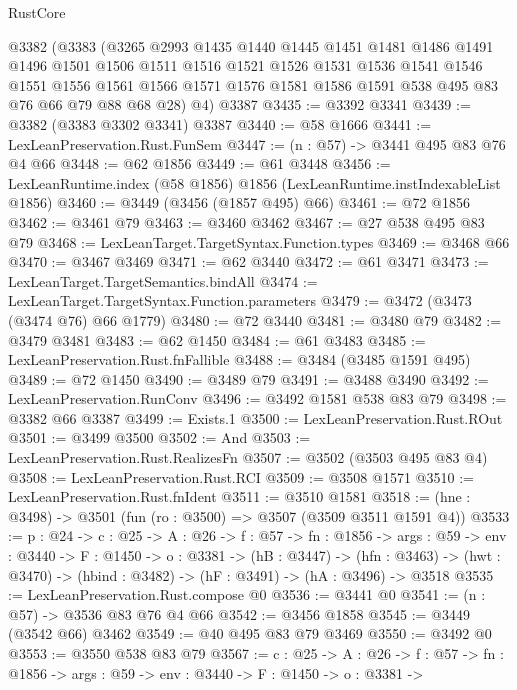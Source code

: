 \begin{lexlean}{RustCore}
\begin{coremodule}
  @3382
    (@3383
      (@3265
        @2993
        @1435
        @1440
        @1445
        @1451
        @1481
        @1486
        @1491
        @1496
        @1501
        @1506
        @1511
        @1516
        @1521
        @1526
        @1531
        @1536
        @1541
        @1546
        @1551
        @1556
        @1561
        @1566
        @1571
        @1576
        @1581
        @1586
        @1591
        @538
        @495
        @83
        @76
        @66
        @79
        @88
        @68
        @28)
      @4)
    @3387
@3435 := @3392 @3341
@3439 := @3382 (@3383 @3302 @3341) @3387
@3440 := @58 @1666
@3441 := LexLeanPreservation.Rust.FunSem
@3447 := (n : @57) -> @3441 @495 @83 @76 @4 @66
@3448 := @62 @1856
@3449 := @61 @3448
@3456 := LexLeanRuntime.index (@58 @1856) @1856 (LexLeanRuntime.instIndexableList @1856)
@3460 := @3449 (@3456 (@1857 @495) @66)
@3461 := @72 @1856
@3462 := @3461 @79
@3463 := @3460 @3462
@3467 := @27 @538 @495 @83 @79
@3468 := LexLeanTarget.TargetSyntax.Function.types
@3469 := @3468 @66
@3470 := @3467 @3469
@3471 := @62 @3440
@3472 := @61 @3471
@3473 := LexLeanTarget.TargetSemantics.bindAll
@3474 := LexLeanTarget.TargetSyntax.Function.parameters
@3479 := @3472 (@3473 (@3474 @76) @66 @1779)
@3480 := @72 @3440
@3481 := @3480 @79
@3482 := @3479 @3481
@3483 := @62 @1450
@3484 := @61 @3483
@3485 := LexLeanPreservation.Rust.fnFallible
@3488 := @3484 (@3485 @1591 @495)
@3489 := @72 @1450
@3490 := @3489 @79
@3491 := @3488 @3490
@3492 := LexLeanPreservation.RunConv
@3496 := @3492 @1581 @538 @83 @79
@3498 := @3382 @66 @3387
@3499 := Exists.{1}
@3500 := LexLeanPreservation.Rust.ROut
@3501 := @3499 @3500
@3502 := And
@3503 := LexLeanPreservation.Rust.RealizesFn
@3507 := @3502 (@3503 @495 @83 @4)
@3508 := LexLeanPreservation.Rust.RCI
@3509 := @3508 @1571
@3510 := LexLeanPreservation.Rust.fnIdent
@3511 := @3510 @1581
@3518 := (hne : @3498) -> @3501 (fun (ro : @3500) => @3507 (@3509 @3511 @1591 @4))
@3533 := {p : @24} ->
  {c : @25} ->
  {A : @26} ->
  {f : @57} ->
  {fn : @1856} ->
  {args : @59} ->
  {env : @3440} ->
  {F : @1450} ->
  {o : @3381} ->
  (hB : @3447) ->
  (hfn : @3463) -> (hwt : @3470) -> (hbind : @3482) -> (hF : @3491) -> (hA : @3496) -> @3518
@3535 := LexLeanPreservation.Rust.compose @0
@3536 := @3441 @0
@3541 := (n : @57) -> @3536 @83 @76 @4 @66
@3542 := @3456 @1858
@3545 := @3449 (@3542 @66) @3462
@3549 := @40 @495 @83 @79 @3469
@3550 := @3492 @0
@3553 := @3550 @538 @83 @79
@3567 := {c : @25} ->
  {A : @26} ->
  {f : @57} ->
  {fn : @1856} ->
  {args : @59} ->
  {env : @3440} ->
  {F : @1450} ->
  {o : @3381} ->

\end{coremodule}
\end{lexlean}
